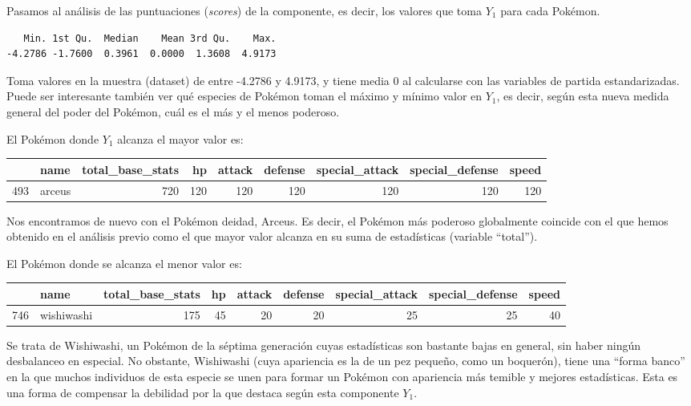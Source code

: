 \documentclass[
  11.8pt,
]{extreport}
\begin{document}
Pasamos al análisis de las puntuaciones (\emph{scores}) de la
componente, es decir, los valores que toma \(Y_1\) para cada Pokémon.

\begin{verbatim}
   Min. 1st Qu.  Median    Mean 3rd Qu.    Max. 
-4.2786 -1.7600  0.3961  0.0000  1.3608  4.9173 
\end{verbatim}

Toma valores en la muestra (dataset) de entre -4.2786 y 4.9173, y tiene
media 0 al calcularse con las variables de partida estandarizadas. Puede
ser interesante también ver qué especies de Pokémon toman el máximo y
mínimo valor en \(Y_1\), es decir, según esta nueva medida general del
poder del Pokémon, cuál es el más y el menos poderoso.

El Pokémon donde \(Y_1\) alcanza el mayor valor es:

\begin{table}[H]
\centering\begingroup\fontsize{9.5}{11.5}\selectfont

\begin{tabular}{llrrrrrrr}
\toprule
  & name & total\_base\_stats & hp & attack & defense & special\_attack & special\_defense & speed\\
\midrule
493 & arceus & 720 & 120 & 120 & 120 & 120 & 120 & 120\\
\bottomrule
\end{tabular}
\endgroup{}
\end{table}

Nos encontramos de nuevo con el Pokémon deidad, Arceus. Es decir, el
Pokémon más poderoso globalmente coincide con el que hemos obtenido en
el análisis previo como el que mayor valor alcanza en su suma de
estadísticas (variable ``total'').

El Pokémon donde se alcanza el menor valor es:

\begin{table}[H]
\centering\begingroup\fontsize{9.5}{11.5}\selectfont

\begin{tabular}{llrrrrrrr}
\toprule
  & name & total\_base\_stats & hp & attack & defense & special\_attack & special\_defense & speed\\
\midrule
746 & wishiwashi & 175 & 45 & 20 & 20 & 25 & 25 & 40\\
\bottomrule
\end{tabular}
\endgroup{}
\end{table}

Se trata de Wishiwashi, un Pokémon de la séptima generación cuyas
estadísticas son bastante bajas en general, sin haber ningún desbalanceo
en especial. No obstante, Wishiwashi (cuya apariencia es la de un pez
pequeño, como un boquerón), tiene una ``forma banco'' en la que muchos
individuos de esta especie se unen para formar un Pokémon con apariencia
más temible y mejores estadísticas. Esta es una forma de compensar la
debilidad por la que destaca según esta componente \(Y_1\).
\end{document}
